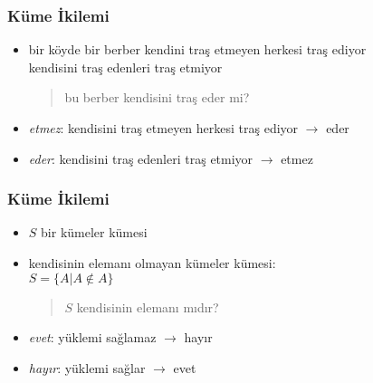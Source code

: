 \documentclass[dvipsnames]{beamer}
\theoremstyle{definition}
\theoremstyle{example}
\theoremstyle{plain}
\begin{document}
\begin{frame}
  \frametitle{Küme İkilemi}

  \begin{itemize}
    \item bir köyde bir berber kendini traş etmeyen herkesi traş ediyor\\
      kendisini traş edenleri traş etmiyor

    \begin{quote}
      bu berber kendisini traş eder mi?
    \end{quote}

    \pause
    \item \emph{etmez}: kendisini traş etmeyen herkesi traş ediyor
      $\rightarrow$ eder

    \pause
    \item \emph{eder}: kendisini traş edenleri traş etmiyor
      $\rightarrow$ etmez
  \end{itemize}
\end{frame}

\begin{frame}
  \frametitle{Küme İkilemi}

  \begin{itemize}
    \item $S$ bir kümeler kümesi

    \pause
    \item kendisinin elemanı olmayan kümeler kümesi:\\
      $S = \{ A | A \notin A \}$

    \pause
    \begin{quote}
      $S$ kendisinin elemanı mıdır?
    \end{quote}

    \pause
    \item \emph{evet}: yüklemi sağlamaz $\rightarrow$ hayır

    \pause
    \item \emph{hayır}: yüklemi sağlar $\rightarrow$ evet
  \end{itemize}
\end{frame}
\end{document}
